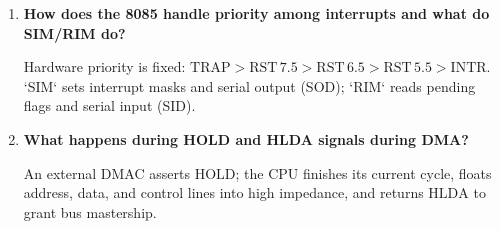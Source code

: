 \documentclass[12pt,a4paper]{article}
\newcommand{\Q}[1]{\textbf{#1}\par\noindent\ignorespaces}
\begin{document}
\begin{tcolorbox}[exambox, title={Frequently Asked / Viva Questions}]
\begin{enumerate}[leftmargin=*, label=\textbf{Q\arabic*.}, itemsep=3.5pt]
  \item \Q{How does the 8085 handle priority among interrupts and what do SIM/RIM do?}
  Hardware priority is fixed: $\mathrm{TRAP} > \mathrm{RST\,7.5} > \mathrm{RST\,6.5} > \mathrm{RST\,5.5} > \mathrm{INTR}$. `SIM` sets interrupt masks and serial output (SOD); `RIM` reads pending flags and serial input (SID).
  \item \Q{What happens during HOLD and HLDA signals during DMA?}
  An external DMAC asserts $\mathrm{HOLD}$; the CPU finishes its current cycle, floats address, data, and control lines into high impedance, and returns $\mathrm{HLDA}$ to grant bus mastership.
\end{enumerate}
\end{tcolorbox}
\end{document}

